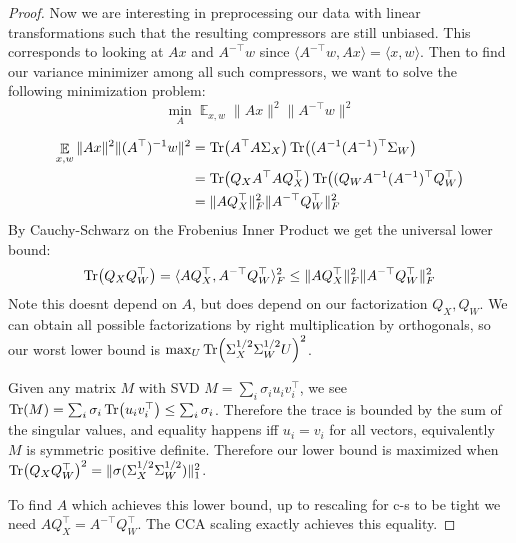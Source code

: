 \documentclass{article}
\theoremstyle{definition}
\theoremstyle{plain}
\DeclareMathOperator{\E}{\mathbb{E}}
\DeclarePairedDelimiter\parentheses{\lparen}{\rparen}
\newcommand{\Tr}[1]{\operatorname{Tr} \parentheses*{#1}}
\begin{document}
\begin{proof}
Now we are interesting in preprocessing our data with linear transformations such that the resulting compressors are still unbiased. This corresponds to looking at $A x$ and $A^{-\top} w$ since $\langle A^{-\top} w, A x \rangle = \langle x, w \rangle$. Then to find our variance minimizer among all such compressors, we want to solve the following minimization problem:
\[ \min_A \E_{x,w} \| A x \|^2 \|A^{-\top} w \|^2 \]

\begin{align*}
 \E_{x,w}\|Ax\|^2\|(A^{\top})^{-1}w\|^2 &= \Tr{A^{\top} A \Sigma_X}\Tr{(A^{-1} (A^{-1})^{\top}\Sigma_W}\\
&= \Tr{Q_X A^{\top} A Q_X^\top}\Tr{(Q_W A^{-1} (A^{-1})^{\top}Q_W^\top}\\
&= \|A Q_X^\top\|^2_F \|A^{-\top} Q_W^\top\|^2_F\\
\end{align*}
By Cauchy-Schwarz on the Frobenius Inner Product we get the universal lower bound:
\[ \Tr{ Q_X Q_W^{\top} } = \langle A Q_X^\top, A^{-\top} Q_W^\top \rangle_F^2 \leq \|A Q_X^\top\|^2_F \|A^{-\top} Q_W^\top\|^2_F \]
Note this doesnt depend on $A$, but does depend on our factorization $Q_X, Q_W$. We can obtain all possible factorizations by right multiplication by orthogonals, so our worst lower bound is $\max_{U} \Tr{\Sigma_X^{1/2} \Sigma_W^{1/2} U}^2$. 

Given any matrix $M$ with SVD $M = \sum_i \sigma_i u_i v_i^\top$, we see $\Tr{M} = \sum_i \sigma_i \Tr{ u_i v_i^\top} \leq \sum_i \sigma_i$. Therefore the trace is bounded by the sum of the singular values, and equality happens iff $u_i = v_i$ for all vectors, equivalently $M$ is symmetric positive definite. Therefore our lower bound is maximized when $\Tr{Q_X Q_W^\top}^2 = \|\sigma( \Sigma_X^{1/2} \Sigma_W^{1/2})\|_1^2$.  

To find $A$ which achieves this lower bound, up to rescaling for c-s to be tight we need $A Q_X^\top = A^{-\top} Q_W^\top$. The CCA scaling exactly achieves this equality.
\end{proof}
\end{document}

